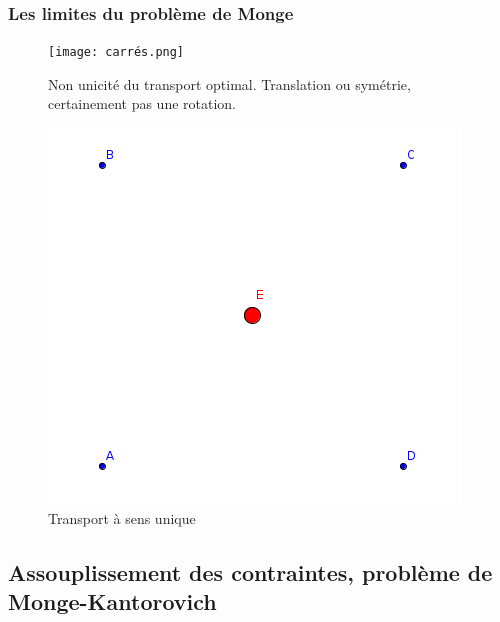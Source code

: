 \documentclass{beamer}
\theoremstyle{definition}
\begin{document}
\begin{frame}
	\frametitle{Les limites du problème de Monge}
	\begin{minipage}[t]{1\linewidth}
		\begin{minipage}{0.4\linewidth}\centering\begin{figure}
				\centering
				\texttt{[image: carrés.png]}
				\caption{ Non unicité du transport optimal. Translation ou symétrie, certainement pas une rotation.}
		\end{figure}\end{minipage}\hfil\quad \quad \quad \quad
		\begin{minipage}{0.43\linewidth}\centering\begin{figure}
				\includegraphics[scale=0.35]{points.png}			
				\caption{Transport à sens unique}
		\end{figure}\end{minipage}
	\end{minipage}
\end{frame}

\subsection{Assouplissement des contraintes, problème de Monge-Kantorovich}
\end{document}
